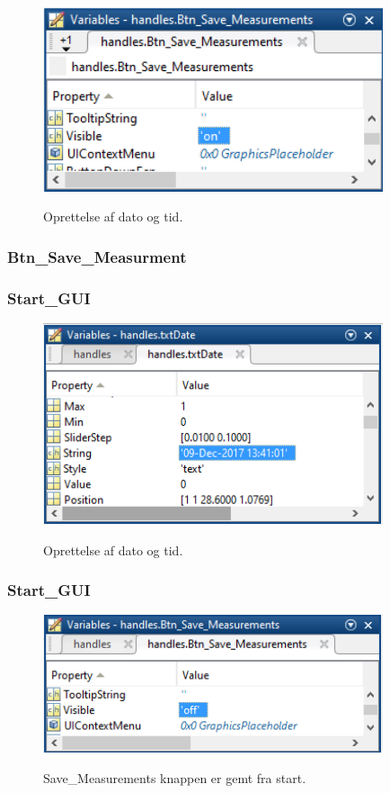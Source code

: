 \begin{figure}[H] 
\centering
{\includegraphics[width=10cm]
{Figure/modultestStart}}
\caption{Oprettelse af dato og tid.}
\label{fig:modultestStart}
\end{figure}


\subsubsection{Btn\_Save\_Measurment}


\subsubsection{Start\_GUI}
 
\begin{figure}[H] 
\centering
{\includegraphics[width=10cm]
{Figure/modulteststartGUI1}}
\caption{Oprettelse af dato og tid.}
\label{fig:modulteststartGUI1}
\end{figure}


\subsubsection{Start\_GUI} 
\begin{figure}[H] 
\centering
{\includegraphics[width=10cm]
{Figure/modulteststartGUI2}}
\caption{Save\_Measurements knappen er gemt fra start.}
\label{fig:modulteststartGUI2}
\end{figure}






